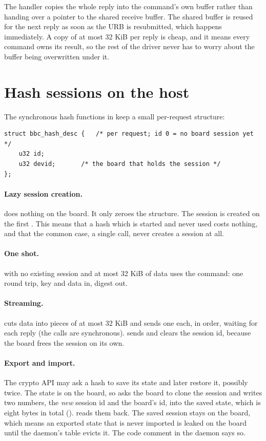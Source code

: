The handler copies the whole reply into the command's own buffer rather than handing over a pointer to the shared receive buffer. The shared buffer is reused for the next reply as soon as the URB is resubmitted, which happens immediately. A copy of at most 32 KiB per reply is cheap, and it means every command owns its result, so the rest of the driver never has to worry about the buffer being overwritten under it.

\section{Hash sessions on the host}\label{sec:hashhost}

The synchronous hash functions in  keep a small per-request structure:

\begin{lstlisting}
struct bbc_hash_desc {   /* per request; id 0 = no board session yet */
	u32 id;
	u32 devid;       /* the board that holds the session */
};
\end{lstlisting}

\paragraph{Lazy session creation.}  does nothing on the board. It only zeroes the structure. The session is created on the first . This means that a hash which is started and never used costs nothing, and that the common case, a single  call, never creates a session at all.

\paragraph{One shot.}  with no existing session and at most 32 KiB of data uses the  command: one round trip, key and data in, digest out.

\paragraph{Streaming.}  cuts data into pieces of at most 32 KiB and sends one  each, in order, waiting for each reply (the calls are synchronous).  sends  and clears the session id, because the board frees the session on its own.

\paragraph{Export and import.} The crypto API may ask a hash to save its state and later restore it, possibly twice. The state is on the board, so  asks the board to clone the session and writes two numbers, the \emph{new} session id and the board's id, into the saved state, which is eight bytes in total ().  reads them back. The saved session stays on the board, which means an exported state that is never imported is leaked on the board until the daemon's table evicts it. The code comment in the daemon says so.

